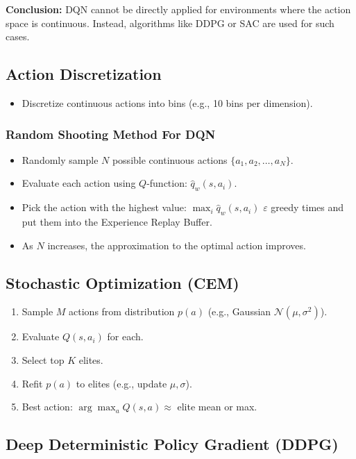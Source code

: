\documentclass[12pt]{article}
\begin{document}
\textbf{Conclusion:} DQN cannot be directly applied for environments where the action space is continuous. Instead, algorithms like DDPG or SAC are used for such cases.

\subsection{Action Discretization}
\begin{itemize}
    \item Discretize continuous actions into bins (e.g., 10 bins per dimension).
\end{itemize}

\subsubsection{Random Shooting Method For DQN}

\begin{itemize}
    \item Randomly sample $N$ possible continuous actions $\{a_1, a_2, \dots, a_N\}$.
    \item Evaluate each action using $Q$-function: $\hat{q}_w(s, a_i)$.
    \item Pick the action with the highest value: $\max_i \hat{q}_w(s, a_i)$ $\varepsilon$ greedy times and put them into the Experience Replay Buffer.
    \item As $N$ increases, the approximation to the optimal action improves.
\end{itemize}

\subsection{Stochastic Optimization (CEM)}
\begin{enumerate}
    \item Sample $M$ actions from distribution $p(a)$ (e.g., Gaussian $\mathcal{N}(\mu, \sigma^2)$).
    \item Evaluate $Q(s, a_i)$ for each.
    \item Select top $K$ elites.
    \item Refit $p(a)$ to elites (e.g., update $\mu, \sigma$).
    \item Best action: $\arg\max_a Q(s,a) \approx$ elite mean or max.
\end{enumerate}

\subsection{Deep Deterministic Policy Gradient (DDPG)}
\label{sec:ddpg}
\end{document}
